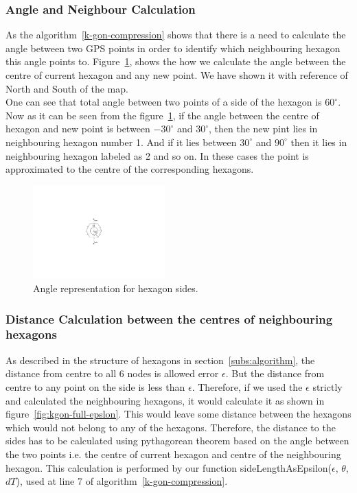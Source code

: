 \documentclass[conference]{IEEEtran}
\begin{document}
\subsubsection{Angle and Neighbour Calculation}
As the algorithm~\ref{k-gon-compression} shows that there is a need to calculate the angle between two GPS 
points in order to identify which neighbouring hexagon this angle points to. Figure~\ref{fig:angle-calculation}, 
shows the how we calculate the angle between the centre of current hexagon and any new point. We have 
shown it with reference of North and South of the map.\\
One can see that total angle between two points of a side of the hexagon is ${60}^{\circ}$. Now as it can be 
seen from the figure~\ref{fig:angle-calculation}, if the angle between the centre of hexagon and new point is
 between ${-30}^{\circ}$ and ${30}^{\circ}$, then the new pint lies in neighbouring hexagon number 1. And if 
 it lies between ${30}^{\circ}$ and ${90}^{\circ}$ then it lies in neighbouring hexagon labeled as 2 and so on. 
 In these cases the point is approximated to the centre of the corresponding hexagons.

\begin{figure}[ht]
\centering
  \includegraphics[width=2in]{images/angle-calculation.pdf}
  \caption {Angle representation for hexagon sides.}\label{fig:angle-calculation}
\end{figure}

\subsubsection{Distance Calculation between the centres of neighbouring hexagons}
As described in the structure of hexagons in section~\ref{subs:algorithm}, the distance from centre to all 6 
nodes is allowed error $\epsilon$. But the distance from centre to any point on the side is less than $\epsilon$. 
Therefore, if we used the $\epsilon$ strictly and calculated the neighbouring hexagons, it would calculate it as 
shown in figure~\ref{fig:kgon-full-epslon}. This would leave some distance between the hexagons which would 
not belong to any of the hexagons. Therefore, the distance to the sides has to be calculated using pythagorean 
theorem based on the angle between the two points i.e. the centre of current hexagon and centre of the neighbouring 
hexagon. This calculation is performed by our function sideLengthAsEpsilon($\epsilon$, $\theta$, $dT$), used at line 
7 of algorithm~\ref{k-gon-compression}.
\end{document}
